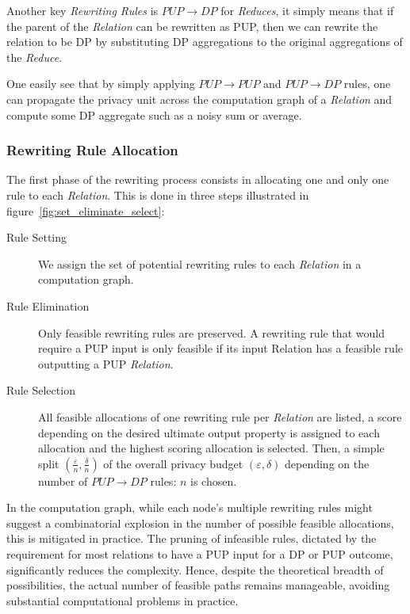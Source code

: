 \documentclass{article}
\begin{document}
    Another key \emph{Rewriting Rules} is $PUP \rightarrow DP$ for \emph{Reduces}, it simply means that if the parent of the \emph{Relation} can be rewritten as PUP, then we can rewrite the relation to be DP by substituting DP aggregations to the original aggregations of the \emph{Reduce}.
    
    One easily see that by simply applying $PUP \rightarrow PUP$ and $PUP \rightarrow DP$ rules, one can propagate the privacy unit across the computation graph of a \emph{Relation} and compute some DP aggregate such as a noisy sum or average.
    
    \subsubsection{Rewriting Rule Allocation}
    
    The first phase of the rewriting process consists in allocating one and only one rule to each \emph{Relation}.
    This is done in three steps illustrated in figure~\ref{fig:set_eliminate_select}:
    \begin{description}
        \item[Rule Setting] We assign the set of potential rewriting rules to each \emph{Relation} in a computation graph.
        \item[Rule Elimination] Only feasible rewriting rules are preserved. A rewriting rule that would require a PUP input is only feasible if its input Relation has a feasible rule outputting a PUP \emph{Relation}.
        \item[Rule Selection] All feasible allocations of one rewriting rule per \emph{Relation} are listed, a score depending on the desired ultimate output property is assigned to each allocation and the highest scoring allocation is selected. Then, a simple split $\left(\frac{\varepsilon}{n}, \frac{\delta}{n}\right)$ of the overall privacy budget $\left(\varepsilon, \delta\right)$ depending on the number of $PUP \rightarrow DP$ rules: $n$ is chosen.
    \end{description}
    
    In the computation graph, while each node's multiple rewriting rules might suggest a combinatorial explosion in the number of possible feasible allocations, this is mitigated in practice. The pruning of infeasible rules, dictated by the requirement for most relations to have a PUP input for a DP or PUP outcome, significantly reduces the complexity. Hence, despite the theoretical breadth of possibilities, the actual number of feasible paths remains manageable, avoiding substantial computational problems in practice.
   
\end{document}
